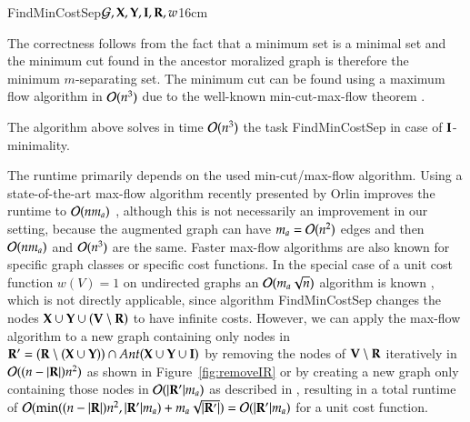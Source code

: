 \begin{algo}{FindMinCostSep}{${\cal G}, {\bf X}, {\bf Y}, {\bf I}, {\bf R}, w$}{\label{algo:findminimumsep}}{16cm} 
%
%
\end{algo}
\begin{analal}
The correctness %
follows from the fact that a minimum set is a minimal set and the minimum cut found in the ancestor moralized graph is therefore the minimum $ m $-separating set. The minimum cut can be found using a maximum flow algorithm in $ {\cal O}(n^3) $ due to the well-known min-cut-max-flow theorem \cite[Chapter~6]{Even1979graphalgorithm}.
\end{analal}
\begin{proposition}
\label{prop:FindMinCostSepI}
The algorithm above solves in time ${\cal O}(n^3)$ the task {\sc FindMinCostSep} in case of ${\bf I}$-minimality.
%
\end{proposition}

The runtime primarily depends on the used min-cut/max-flow algorithm. Using a state-of-the-art max-flow algorithm recently presented by Orlin improves the runtime to $ {\cal O}(n m_{a}) $ \cite{maxflowOrlin2013}, although this is not necessarily an improvement in our setting, because the augmented graph can have $ m_a = {\cal O}(n^2) $ edges and then $ {\cal O}(n m_{a})$ and ${\cal O}(n^3) $ are the same. Faster max-flow algorithms are also known for specific graph classes or specific cost functions. In the special case of a unit cost function $w(V) = 1$ on undirected graphs an $ {\cal O}(m_{a} \sqrt{n}) $ algorithm is known \cite{Even1979graphalgorithm}, which is not directly applicable, since algorithm {\sc FindMinCostSep} changes the nodes $ {\bf X} \cup {\bf Y} \cup ({\bf V} \setminus {\bf R}) $ to have infinite costs.  However, we can apply the max-flow algorithm to a new graph containing only nodes in $ {\bf R}' = ({\bf R}\setminus({\bf X} \cup {\bf Y})) \cap \textit{Ant}({\bf X}\cup{\bf Y}\cup{\bf I})$ by removing the nodes of $ {\bf V}\setminus{\bf R} $ iteratively in ${\cal O}((n - |{\bf R}|) n^2)$ as shown in Figure~\ref{fig:removeIR} or by creating a new graph only containing those nodes in $ {\cal O}(|{\bf R}'| m_{a}) $ as described in \cite{TianPP1998}, resulting in a total runtime of $ {\cal O}(\min((n - |{\bf R}|) n^2, |{\bf R}'|m_{a}) + m_{a} \sqrt{|{\bf R}'|}) = {\cal O}(|{\bf R}'|m_{a}) $ for a unit cost function.



